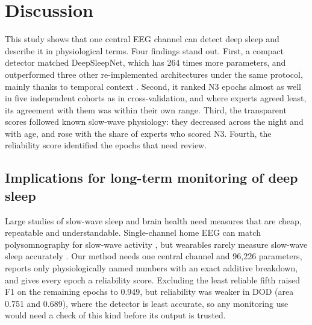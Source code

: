 \section{Discussion}
This study shows that one central EEG channel can detect deep sleep and describe it in physiological terms. Four findings stand out. First, a compact detector matched DeepSleepNet, which has 264 times more parameters, and outperformed three other re-implemented architectures under the same protocol, mainly thanks to temporal context \cite{phan2022sleeptransformer,phan2023lseqsleepnet}. Second, it ranked N3 epochs almost as well in five independent cohorts as in cross-validation, and where experts agreed least, its agreement with them was within their own range. Third, the transparent scores followed known slow-wave physiology: they decreased across the night \cite{borbely2016twoprocess,riedner2007slowwaves} and with age, and rose with the share of experts who scored N3. Fourth, the reliability score identified the epochs that need review. %

\subsection{Implications for long-term monitoring of deep sleep}
Large studies of slow-wave sleep and brain health \cite{xie2013clearance,baril2021brainaging,himali2023dementia} need measures that are cheap, repeatable and understandable. Single-channel home EEG can match polysomnography for slow-wave activity \cite{lucey2016singlechannel}, but wearables rarely measure slow-wave sleep accurately \cite{green2022devices}. Our method needs one central channel and 96,226 parameters, reports only physiologically named numbers with an exact additive breakdown, and gives every epoch a reliability score. Excluding the least reliable fifth raised F1 on the remaining epochs to 0.949, but reliability was weaker in DOD (area 0.751 and 0.689), where the detector is least accurate, so any monitoring use would need a check of this kind before its output is trusted. %

